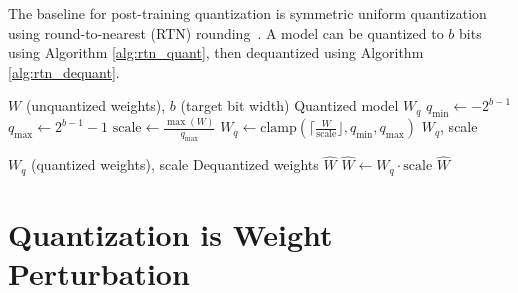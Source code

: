 \documentclass[../main.tex]{subfiles}
\begin{document}
The baseline for post-training quantization is symmetric uniform quantization using round-to-nearest (RTN) rounding~\cite{nagelWhitePaperNeural2021b}. A model can be quantized to $b$ bits using Algorithm \ref{alg:rtn_quant}, then dequantized using Algorithm \ref{alg:rtn_dequant}.

\begin{algorithm}[H]
\caption{Baseline RTN Quantization}\label{alg:rtn_quant}
\begin{algorithmic}[1]
\Require $W$ (unquantized weights), $b$ (target bit width)
\Ensure Quantized model $W_q$
\State $q_{\text{min}} \gets -2^{b - 1}$
\State $q_{\text{max}} \gets 2^{b - 1} - 1$
\State $\text{scale} \gets \frac{\max(W)}{q_{\text{max}}}$
\State $W_q \gets \text{clamp}\left(\lceil \frac{W}{\text{scale}} \rfloor, q_\text{min}, q_\text{max}\right)$
\State \Return $W_q$, scale
\end{algorithmic}
\end{algorithm}

\begin{algorithm}[H]
\caption{Baseline RTN Dequantization}\label{alg:rtn_dequant}
\begin{algorithmic}[1]
\Require $W_q$ (quantized weights), scale
\Ensure Dequantized weights $\hat{W}$
\State $\hat{W} \gets W_q \cdot \text{scale}$
\State \Return $\hat{W}$
\end{algorithmic}
\end{algorithm}

\section{Quantization is Weight Perturbation} \label{sec:quant_is_perturb}
\end{document}
